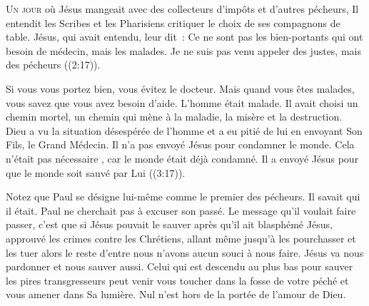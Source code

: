 



\lettrine{U}{n jour} où Jésus mangeait avec des collecteurs d'impôts
 et d'autres pécheurs, Il entendit les Scribes et les Pharisiens
 critiquer le choix de ses compagnons de table.
 \Og Jésus, qui avait entendu, leur dit~:
 Ce ne sont pas les bien-portants qui ont besoin de médecin,
 mais les malades. Je ne suis pas venu appeler des justes,
 mais des pécheurs \Fg{} 
 ((2:17)).


Si vous vous portez bien, vous évitez le docteur.
 Mais quand vous êtes malades, vous savez que vous avez besoin d'aide.
 L'homme était malade. Il avait choisi un chemin mortel,
 un chemin qui mène à la maladie, la misère et la destruction.
 Dieu a vu la situation désespérée de l'homme et a eu pitié de lui
 en envoyant Son Fils, le Grand Médecin.
 Il n'a pas envoyé Jésus pour condamner le monde.
 Cela n'était pas nécessaire ,
 car le monde était déjà condamné. Il a envoyé Jésus
 \Og pour que le monde soit sauvé par Lui \Fg{} 
 ((3:17)).

Notez que Paul se désigne lui-même comme le premier des pécheurs.
 Il savait qui il était. Paul ne cherchait pas à excuser son passé.
 Le message qu'il voulait faire passer, c'est que si Jésus pouvait le sauver
 \ocadr après qu'il ait blasphémé Jésus, approuvé les crimes
 contre les Chrétiens, allant même jusqu'à les pourchasser
 et les tuer \fcadr{} alors le reste d'entre nous n'avons aucun souci
 à nous faire. Jésus va nous pardonner et nous sauver aussi.
 Celui qui est descendu au plus bas pour sauver les pires transgresseurs
 peut venir vous toucher dans la fosse de votre péché
 et vous amener dans Sa lumière.
 Nul n'est hors de la portée de l'amour de Dieu.

\dvrule



